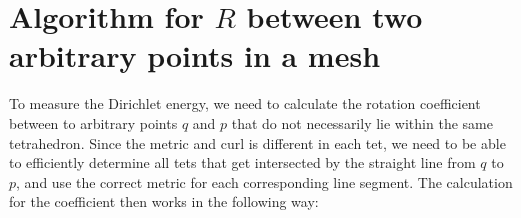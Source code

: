 \documentclass[../thesis.tex]{subfiles}
\begin{document}
\newcommand{\str}[1]{\textsc{#1}}
\newcommand{\var}[1]{\textit{#1}}
\newcommand{\op}[1]{\textsl{#1}}
\def \ifempty#1{\def\temp{#1} \ifx\temp\empty }
\newcommand{\msg}[2]{\ensuremath{\ifempty{#2} [\str{#1}] \else [\str{#1}, {#2}] \fi}}
\newcommand{\tup}[1]{\ensuremath{\langle #1 \rangle}}
\newcommand{\nil}{\ensuremath{\bot}}
\newcommand{\false}{\textsc{false}\xspace}
\newcommand{\true}{\textsc{true}\xspace}

\newcommand\lastts{\var{lastts}\xspace}
\newcommand\nextts{\var{nextts}\xspace}
\newcommand\trusted{\var{trusted}\xspace}
\newcommand\newepoch{\var{newepoch}\xspace}
\newcommand\leader{\var{leader}\xspace}
\newcommand\ts{\var{ts}\xspace}
\newcommand{\CK}{\ensuremath{\mathcal{K}}\xspace}
\newcommand{\CP}{\ensuremath{\mathcal{P}}\xspace}
\newcommand{\CQ}{\ensuremath{\mathcal{Q}}\xspace}

\chapter{Algorithm for $R$ between two arbitrary points in a mesh}
To measure the Dirichlet energy, we need to calculate the rotation coefficient
between to arbitrary points $q$ and $p$ that do not necessarily lie within the same 
tetrahedron. Since the metric and curl is different in each tet, we need to be
able to efficiently determine all tets that get intersected by the straight
line from $q$ to $p$, and use the correct metric for each corresponding
line segment.
The calculation for the coefficient then works in the following way:
\end{document}
